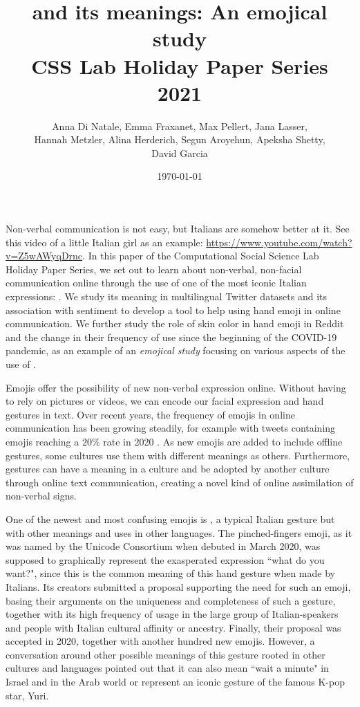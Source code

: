 \documentclass{article}
\title{\emoji{pinched-fingers} and its meanings: An emojical study \\ \normalsize{CSS Lab Holiday Paper Series 2021}}
\author{Anna Di Natale, Emma Fraxanet, Max Pellert, Jana Lasser,\\ Hannah Metzler, Alina Herderich, Segun Aroyehun, Apeksha Shetty,\\ David Garcia}
\date{\today}
\begin{document}
\maketitle

Non-verbal communication is not easy, but Italians are somehow better at it. See this video of a little Italian girl as an example: \url{https://www.youtube.com/watch?v=Z5wAWyqDrnc}. In this paper of the Computational Social Science Lab Holiday Paper Series, we set out to learn about non-verbal, non-facial communication online through the use of one of the most iconic Italian expressions: . We study its meaning in multilingual Twitter datasets and its association with sentiment to develop a tool to help using hand emoji in online communication. We further study the role of skin color in hand emoji in Reddit and the change in their frequency of use since the beginning of the COVID-19 pandemic, as an example of an \emph{emojical study} focusing on various aspects of the use of .


Emojis offer the possibility of new non-verbal expression online. Without having to rely on pictures or videos, we can encode our facial expression and hand gestures in text.
Over recent years, the frequency of emojis in online communication has been growing steadily, for example with tweets containing emojis reaching a 20\% rate in 2020 \cite{Emojipedia}. As new emojis are added to include offline gestures, some cultures use them with different meanings as others. Furthermore, gestures can have a meaning in a culture and be adopted by another culture through online text communication, creating a novel kind of online assimilation of non-verbal signs.

One of the newest and most confusing emojis is , a typical Italian gesture but with other meanings and uses in other languages. The pinched-fingers emoji, as it was named by the Unicode Consortium when debuted in March 2020, was supposed to graphically represent the exasperated expression ``what do you want?", since this is the common meaning of this hand gesture when made by Italians. Its creators submitted a proposal \cite{Unicode} supporting the need for such an emoji, basing their arguments on the uniqueness and completeness of such a gesture, together with its high frequency of usage in the large group of Italian-speakers and people with Italian cultural affinity or ancestry. Finally, their proposal was accepted in 2020, together with another hundred new emojis. However, a conversation around other possible meanings of this gesture rooted in other cultures and languages pointed out that it can also mean ``wait a minute" in Israel and in the Arab world or represent an iconic gesture of the famous K-pop star, Yuri. 
\end{document}
